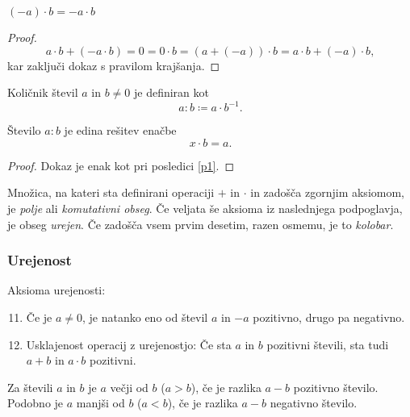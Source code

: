 \documentclass[12pt, a4paper]{article}
\begin{document}
\begin{posledica}
$(-a)\cdot b=-a\cdot b$
\end{posledica}

\begin{proof}
\[
a\cdot b+(-a\cdot b)=0=0\cdot b=(a+(-a))\cdot b=a\cdot b+(-a)\cdot b,
\]
kar zaključi dokaz s pravilom krajšanja.
\end{proof}

\begin{definicija} Količnik števil $a$ in $b\ne 0$ je definiran kot
\[
a:b\coloneqq a\cdot b^{-1}.
\]
\end{definicija}

\begin{posledica}
Število $a:b$ je edina rešitev enačbe
\[
x\cdot b=a.
\]
\end{posledica}

\begin{proof}
Dokaz je enak kot pri posledici \ref{p1}.
\end{proof}

\begin{definicija}
Množica, na kateri sta definirani operaciji $+$ in $\cdot$ in zadošča zgornjim aksiomom, je \emph{polje} ali \emph{komutativni obseg}. Če veljata še aksioma iz naslednjega podpoglavja, je obseg \emph{urejen}. Če zadošča vsem prvim desetim, razen osmemu, je to \emph{kolobar}.
\end{definicija}

\newpage

\subsubsection{Urejenost}

\begin{okvir}
\begin{definicija}
Aksioma urejenosti:

\begin{enumerate}[label=A\arabic*.]
\setcounter{enumi}{10}
\item Če je $a\ne 0$, je natanko eno od števil $a$ in $-a$ pozitivno, drugo pa negativno.
\item Usklajenost operacij z urejenostjo: Če sta $a$ in $b$ pozitivni števili, sta tudi $a+b$ in $a\cdot b$ pozitivni.
\end{enumerate}
\end{definicija}
\end{okvir}

\begin{definicija}
Za števili $a$ in $b$ je $a$ večji od $b$ ($a>b$), če je razlika $a-b$ pozitivno število. Podobno je $a$ manjši od $b$ ($a<b$), če je razlika $a-b$ negativno število.
\end{definicija}
\end{document}

